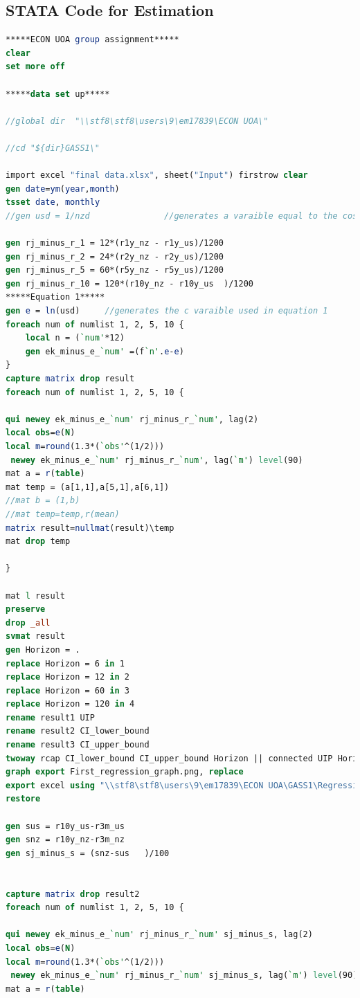 \documentclass[10pt]{article}
\begin{document}
\subsection{STATA Code for Estimation}
\begin{lstlisting}[language=STATA]
*****ECON UOA group assignment*****
clear
set more off

*****data set up*****

//global dir  "\\stf8\stf8\users\9\em17839\ECON UOA\"

//cd "${dir}GASS1\"

import excel "final data.xlsx", sheet("Input") firstrow clear
gen date=ym(year,month)
tsset date, monthly
//gen usd = 1/nzd				//generates a varaible equal to the cost of 1 nzd in usd

gen rj_minus_r_1 = 12*(r1y_nz - r1y_us)/1200
gen rj_minus_r_2 = 24*(r2y_nz - r2y_us)/1200
gen rj_minus_r_5 = 60*(r5y_nz - r5y_us)/1200
gen rj_minus_r_10 = 120*(r10y_nz - r10y_us	)/1200
*****Equation 1*****
gen e = ln(usd)		//generates the c varaible used in equation 1
foreach num of numlist 1, 2, 5, 10 {
	local n = (`num'*12)
	gen ek_minus_e_`num' =(f`n'.e-e)
}
capture matrix drop result
foreach num of numlist 1, 2, 5, 10 {

qui newey ek_minus_e_`num' rj_minus_r_`num', lag(2)
local obs=e(N)
local m=round(1.3*(`obs'^(1/2)))
 newey ek_minus_e_`num' rj_minus_r_`num', lag(`m') level(90)
mat a = r(table)
mat temp = (a[1,1],a[5,1],a[6,1])
//mat b = (1,b)	
//mat temp=temp,r(mean)
matrix result=nullmat(result)\temp
mat drop temp

}
	
mat l result
preserve
drop _all
svmat result
gen Horizon = .
replace Horizon = 6 in 1
replace Horizon = 12 in 2
replace Horizon = 60 in 3
replace Horizon = 120 in 4
rename result1 UIP
rename result2 CI_lower_bound
rename result3 CI_upper_bound
twoway rcap CI_lower_bound CI_upper_bound Horizon || connected UIP Horizon, ti("Figure 1: Estimated coefficients from canonical""UIP regression at different horizons")
graph export First_regression_graph.png, replace
export excel using "\\stf8\stf8\users\9\em17839\ECON UOA\GASS1\Regression.xls", replace
restore

gen sus = r10y_us-r3m_us
gen snz = r10y_nz-r3m_nz
gen sj_minus_s = (snz-sus	)/100	
	
	
capture matrix drop result2
foreach num of numlist 1, 2, 5, 10 {

qui newey ek_minus_e_`num' rj_minus_r_`num' sj_minus_s, lag(2)
local obs=e(N)
local m=round(1.3*(`obs'^(1/2)))
 newey ek_minus_e_`num' rj_minus_r_`num' sj_minus_s, lag(`m') level(90)
mat a = r(table)


\end{lstlisting}
\end{document}
